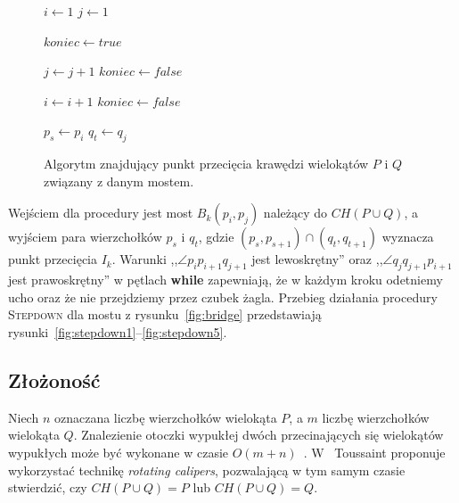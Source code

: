 \begin{figure}[htp]
  \begin{algorithmic}[1]

    \State $i \gets 1$
    \State $j \gets 1$


    \Repeat
    \State $koniec \gets true$


    \State $j \gets j + 1$
    \State $koniec \gets false$
    \EndWhile


    \State $i \gets i + 1$
    \State $koniec \gets false$
    \EndWhile



    \State $p_s \gets p_i$
    \State $q_t \gets q_j$

    \EndProcedure
  \end{algorithmic}
  \caption{\label{alg:stepdown} Algorytm znajdujący punkt przecięcia
    krawędzi wielokątów $P$ i $Q$ związany z danym mostem.}
\end{figure}

Wejściem dla procedury jest most $B_k(p_i,p_j)$ należący do $CH(P \cup
Q)$, a wyjściem para wierzchołków $p_s$ i $q_t$, gdzie $(p_s,p_{s+1})
\cap (q_t,q_{t+1})$ wyznacza punkt przecięcia $I_k$. Warunki ,,$\angle
p_{i}p_{i+1}q_{j+1}$ jest lewoskrętny'' oraz ,,$\angle
q_{j}q_{j+1}p_{i+1}$ jest prawoskrętny'' w pętlach \textbf{while}
zapewniają, że w każdym kroku odetniemy ucho oraz że nie przejdziemy
przez czubek żagla. Przebieg działania procedury \textsc{Stepdown} dla
mostu z rysunku~\ref{fig:bridge} przedstawiają
rysunki~\ref{fig:stepdown1}--\ref{fig:stepdown5}.

\subsection{Złożoność}
Niech $n$ oznaczana liczbę wierzchołków wielokąta $P$, a $m$ liczbę
wierzchołków wielokąta $Q$. Znalezienie otoczki wypukłej dwóch
przecinających się wielokątów wypukłych może być wykonane w czasie
$O(m + n)$~\cite{Toussaint83}. W~\cite{ToussaintInt} Toussaint
proponuje wykorzystać technikę \emph{rotating calipers}, pozwalającą w
tym samym czasie stwierdzić, czy $CH(P \cup Q) = P$ lub $CH(P \cup Q)
= Q$.

